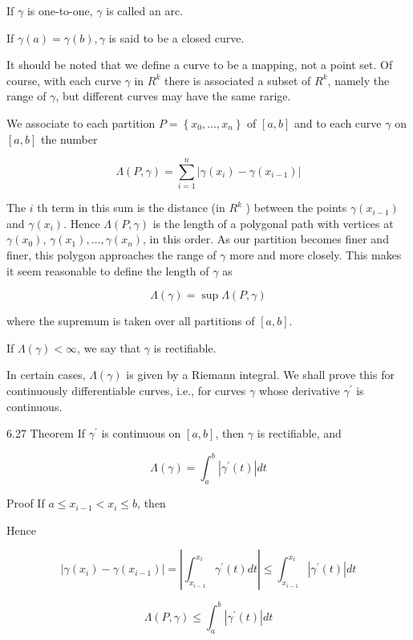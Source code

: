 \documentclass[10pt]{article}
\begin{document}
If $\gamma$ is one-to-one, $\gamma$ is called an arc.

If $\gamma(a)=\gamma(b), \gamma$ is said to be a closed curve.

It should be noted that we define a curve to be a mapping, not a point set. Of course, with each curve $\gamma$ in $R^{k}$ there is associated a subset of $R^{k}$, namely the range of $\gamma$, but different curves may have the same rarige.

We associate to each partition $P=\left\{x_{0}, \ldots, x_{n}\right\}$ of $[a, b]$ and to each curve $\gamma$ on $[a, b]$ the number

$$
\Lambda(P, \gamma)=\sum_{i=1}^{n}\left|\gamma\left(x_{i}\right)-\gamma\left(x_{i-1}\right)\right|
$$

The $i$ th term in this sum is the distance (in $R^{k}$ ) between the points $\gamma\left(x_{i-1}\right)$ and $\gamma\left(x_{i}\right)$. Hence $\Lambda(P, \gamma)$ is the length of a polygonal path with vertices at $\gamma\left(x_{0}\right)$, $\gamma\left(x_{1}\right), \ldots, \gamma\left(x_{n}\right)$, in this order. As our partition becomes finer and finer, this polygon approaches the range of $\gamma$ more and more closely. This makes it seem reasonable to define the length of $\gamma$ as

$$
\Lambda(\gamma)=\sup \Lambda(P, \gamma)
$$

where the supremum is taken over all partitions of $[a, b]$.

If $\Lambda(\gamma)<\infty$, we say that $\gamma$ is rectifiable.

In certain cases, $\Lambda(\gamma)$ is given by a Riemann integral. We shall prove this for continuously differentiable curves, i.e., for curves $\gamma$ whose derivative $\gamma^{\prime}$ is continuous.

6.27 Theorem If $\gamma^{\prime}$ is continuous on $[a, b]$, then $\gamma$ is rectifiable, and

$$
\Lambda(\gamma)=\int_{a}^{b}\left|\gamma^{\prime}(t)\right| d t
$$

Proof If $a \leq x_{i-1}<x_{i} \leq b$, then

Hence

$$
\left|\gamma\left(x_{i}\right)-\gamma\left(x_{i-1}\right)\right|=\left|\int_{x_{i-1}}^{x_{t}} \gamma^{\prime}(t) d t\right| \leq \int_{x_{i-1}}^{x_{t}}\left|\gamma^{\prime}(t)\right| d t
$$

$$
\Lambda(P, \gamma) \leq \int_{a}^{b}\left|\gamma^{\prime}(t)\right| d t
$$
\end{document}
